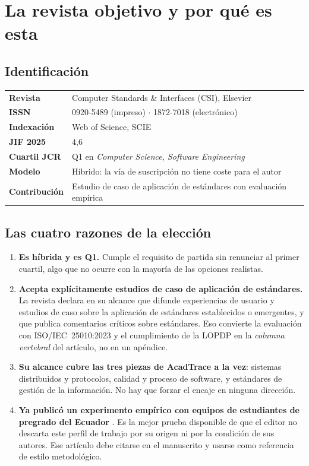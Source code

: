 \documentclass[11pt,a4paper]{article}
\begin{document}
\section{La revista objetivo y por qué es esta}

\subsection{Identificación}

\begin{center}
	\small
	\begin{tabular}{@{}p{4.4cm}p{10.6cm}@{}}
		\toprule
		\textbf{Revista} & Computer Standards \& Interfaces (CSI), Elsevier \\
		\textbf{ISSN} & 0920-5489 (impreso) $\cdot$ 1872-7018 (electrónico) \\
		\textbf{Indexación} & Web of Science, SCIE \\
		\textbf{JIF 2025} & 4,6 \\
		\textbf{Cuartil JCR} & Q1 en \emph{Computer Science, Software Engineering} \\
		\textbf{Modelo} & Híbrido: la vía de suscripción no tiene coste para el autor \\
		\textbf{Contribución} & Estudio de caso de aplicación de estándares con evaluación empírica \\
		\bottomrule
	\end{tabular}
\end{center}

\subsection{Las cuatro razones de la elección}

\begin{enumerate}[leftmargin=*,itemsep=5pt]
	\item \textbf{Es híbrida y es Q1.} Cumple el requisito de partida sin renunciar al primer cuartil, algo que no ocurre con la mayoría de las opciones realistas.
	\item \textbf{Acepta explícitamente estudios de caso de aplicación de estándares.} La revista declara en su alcance que difunde experiencias de usuario y estudios de caso sobre la aplicación de estándares establecidos o emergentes, y que publica comentarios críticos sobre estándares. Eso convierte la evaluación con \mbox{ISO/IEC 25010:2023} \cite{iso25010_2023} y el cumplimiento de la LOPDP \cite{lopdp2021} en la \emph{columna vertebral} del artículo, no en un apéndice.
	\item \textbf{Su alcance cubre las tres piezas de AcadTrace a la vez}: sistemas distribuidos y protocolos, calidad y proceso de software, y estándares de gestión de la información. No hay que forzar el encaje en ninguna dirección.
	\item \textbf{Ya publicó un experimento empírico con equipos de estudiantes de pregrado del Ecuador} \cite{castillo2020iso29110}. Es la mejor prueba disponible de que el editor no descarta este perfil de trabajo por su origen ni por la condición de sus autores. Ese artículo debe citarse en el manuscrito y usarse como referencia de estilo metodológico.
\end{enumerate}
\end{document}
